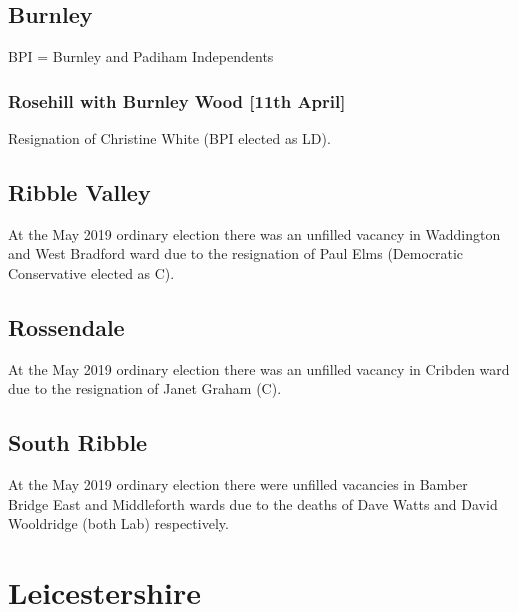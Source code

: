 \documentclass[a4paper,openany]{book}
\begin{document}
\begin{resultsiii}
\subsection*{Burnley}

BPI = Burnley and Padiham Independents

\subsubsection*{Rosehill with Burnley Wood \hspace*{\fill}\nolinebreak[1]%
	\enspace\hspace*{\fill}
	[11th April]}


Resignation of Christine White (BPI elected as LD).

\subsection*{Ribble Valley}

At the May 2019 ordinary election there was an unfilled vacancy in Waddington and West Bradford ward due to the resignation of Paul Elms (Democratic Conservative elected as C).

\subsection*{Rossendale}

At the May 2019 ordinary election there was an unfilled vacancy in Cribden ward due to the resignation of Janet Graham (C).

\subsection*{South Ribble}

At the May 2019 ordinary election there were unfilled vacancies in Bamber Bridge East and Middleforth wards due to the deaths of Dave Watts and David Wooldridge (both Lab) respectively.

\section{Leicestershire}


\end{resultsiii}
\end{document}
